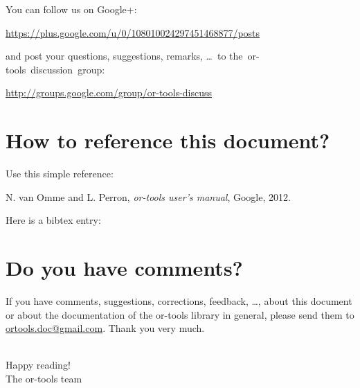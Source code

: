 \begin{titlepage}
You can follow us on Google+:\\
\begin{center}
\url{https://plus.google.com/u/0/108010024297451468877/posts}
\end{center}
and post your questions, suggestions, remarks, \ldots\ to the~or-tools~discussion~group:
\begin{center}
\url{http://groups.google.com/group/or-tools-discuss}
\end{center}

\section*{How to reference this document?}

Use this simple reference:
\begin{center}
N. van Omme and L. Perron, \emph{or-tools user's manual}, Google, 2012.
\end{center}

Here is a bibtex entry:


\section*{Do you have comments?}

If you have comments, suggestions, corrections, feedback, \ldots,  about this document or about the documentation of the or-tools library in general, please send them
to \href{mailto:ortools.doc@gmail.com}{ortools.doc@gmail.com}. Thank you very much.


~\\
Happy reading!\\

The or-tools team
\end{titlepage}
